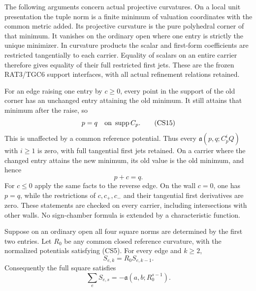 The following arguments concern actual projective curvatures.  On
a local unit presentation the tuple norm is a finite minimum of
valuation coordinates with the common metric added.  Its projective
curvature is the pure polyhedral corner of that minimum.  It
vanishes on the ordinary open where one entry is strictly the unique
minimizer.  In curvature products the scalar and first-form
coefficients are restricted tangentially to each carrier.  Equality
of scalars on an entire carrier therefore gives equality of their
full restricted first jets.  These are the frozen RAT3/TGC6 support
interfaces, with all actual refinement relations retained.

For an edge raising one entry by $c\ge0$, every point in the support
of the old corner has an unchanged entry attaining the old minimum.
It still attains that minimum after the raise, so
\[
                         p=q\quad\hbox{on }\operatorname{supp}C_p.
 \tag{CS15}
\]
This is unaffected by a common reference potential.  Thus every
$\mathfrak a(p,q;C_p^iQ)$ with $i\ge1$ is zero, with full tangential
first jets retained.  On a carrier where the changed entry attains
the new minimum, its old value is the old minimum, and hence
\[
                              p+c=q.
 \tag{CS16}
\]
For $c\le0$ apply the same facts to the reverse edge.  On the wall
$c=0$, one has $p=q$, while the restrictions of $c,c_+,c_-$ and
their tangential first derivatives are zero.  These statements
are checked on every carrier, including intersections with other
walls.  No sign-chamber formula is extended by a characteristic
function.

\begin{lemma}
Suppose on an ordinary open all four square norms are determined
by the first two entries.  Let $R_0$ be any common closed reference
curvature, with the normalized potentials satisfying (CS5).
For every edge and $k\ge2$,
\[
                         S_{e,k}=R_0S_{e,k-1}.
 \tag{CS17}
\]
Consequently the full square satisfies
\[
                \sum_e S_{e,s}
                      =-\mathfrak a(a,b;R_0^{s-1}).
 \tag{CS18}
\]
\end{lemma}

